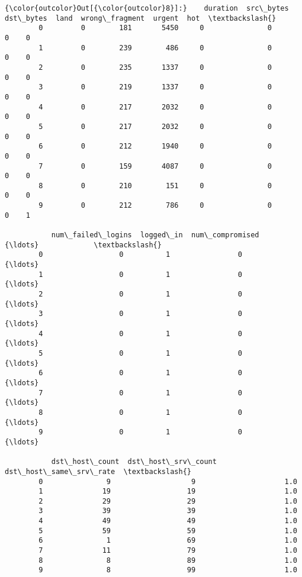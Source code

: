 \documentclass[11pt]{article}
\begin{document}
\begin{Verbatim}[commandchars=\\\{\}]
{\color{outcolor}Out[{\color{outcolor}8}]:}    duration  src\_bytes  dst\_bytes  land  wrong\_fragment  urgent  hot  \textbackslash{}
        0         0        181       5450     0               0       0    0   
        1         0        239        486     0               0       0    0   
        2         0        235       1337     0               0       0    0   
        3         0        219       1337     0               0       0    0   
        4         0        217       2032     0               0       0    0   
        5         0        217       2032     0               0       0    0   
        6         0        212       1940     0               0       0    0   
        7         0        159       4087     0               0       0    0   
        8         0        210        151     0               0       0    0   
        9         0        212        786     0               0       0    1   
        
           num\_failed\_logins  logged\_in  num\_compromised            {\ldots}             \textbackslash{}
        0                  0          1                0            {\ldots}              
        1                  0          1                0            {\ldots}              
        2                  0          1                0            {\ldots}              
        3                  0          1                0            {\ldots}              
        4                  0          1                0            {\ldots}              
        5                  0          1                0            {\ldots}              
        6                  0          1                0            {\ldots}              
        7                  0          1                0            {\ldots}              
        8                  0          1                0            {\ldots}              
        9                  0          1                0            {\ldots}              
        
           dst\_host\_count  dst\_host\_srv\_count  dst\_host\_same\_srv\_rate  \textbackslash{}
        0               9                   9                     1.0   
        1              19                  19                     1.0   
        2              29                  29                     1.0   
        3              39                  39                     1.0   
        4              49                  49                     1.0   
        5              59                  59                     1.0   
        6               1                  69                     1.0   
        7              11                  79                     1.0   
        8               8                  89                     1.0   
        9               8                  99                     1.0   
        

\end{Verbatim}
\end{document}
